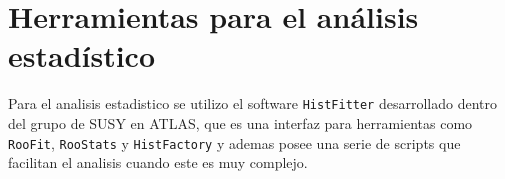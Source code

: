 \section{Herramientas para el análisis estadístico}

Para el analisis estadistico se utilizo el software \texttt{HistFitter} \cite{histfitter}
desarrollado dentro del grupo de SUSY en ATLAS, que es una interfaz para herramientas
como \texttt{RooFit}, \texttt{RooStats}\cite{Moneta:2010pm} y \texttt{HistFactory}
\cite{Cranmer:1456844} y ademas posee una serie de scripts que facilitan el analisis cuando este
es muy complejo.
